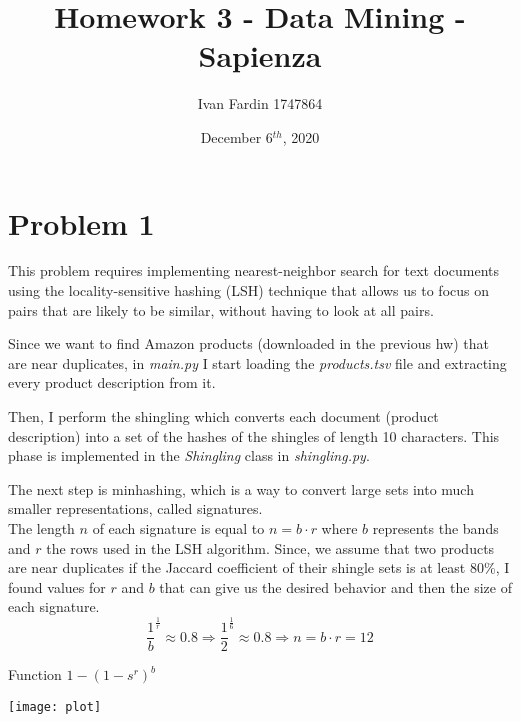 \documentclass[11pt]{article}
\begin{document}
\title{Homework 3 - Data Mining - Sapienza}
\author{Ivan Fardin 1747864}
\date{December 6$^{th}$, 2020}

\maketitle

\tableofcontents

\newpage
\section{Problem 1}
This problem requires implementing nearest-neighbor search for text documents using the locality-sensitive hashing (LSH)
technique that allows us to focus on pairs that are likely to be similar, without having to look at all pairs.

\bigskip
Since we want to find Amazon products (downloaded in the previous hw) that are near duplicates,
in \textit{main.py} I start loading the \textit{products.tsv} file and extracting every product description from it.

\bigskip
Then, I perform the shingling which converts each document (product description) into a set of the hashes of the shingles of
length 10 characters.
This phase is implemented in the \textit{Shingling} class in \textit{shingling.py}.

\bigskip
The next step is minhashing, which is a way to convert large sets into much smaller representations, called signatures. \\
The length $n$ of each signature is equal to $ n = b \cdot r $ where $b$ represents the bands and $r$ the rows used in the LSH
algorithm.
Since, we assume that two products are near duplicates if the Jaccard coefficient of their shingle sets is at least 80\%,
I found values for $r$ and $b$ that can give us the desired behavior and then the size of each signature. \\
$$ \frac{1}{b}^\frac{1}{r} \approx 0.8 \Rightarrow \frac{1}{2}^\frac{1}{6} \approx 0.8 \Rightarrow n = b \cdot r = 12 $$

\bigskip
\hspace{5.6cm} Function $1 - (1-s^r)^b$ \\
\begin{minipage}{0.5cm}
\end{minipage}
\begin{minipage}{15cm}
  \centering
  \hfill
  \texttt{[image: plot]}
\end{minipage}
\end{document}
